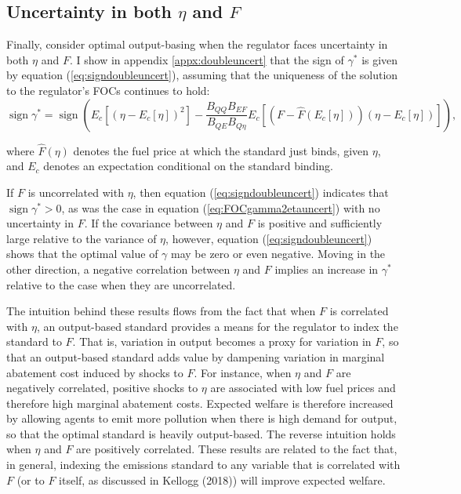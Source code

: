 \documentclass[12pt]{article}
\DeclareMathOperator{\sign}{sign}
\begin{document}
\subsection{Uncertainty in both $\eta$ and $F$} \label{sec:etaFuncert}

Finally, consider optimal output-basing when the regulator faces uncertainty in both $\eta$ and $F$. I show in appendix \ref{appx:doubleuncert} that the sign of $\gamma^*$ is given by equation (\ref{eq:signdoubleuncert}), assuming that the uniqueness of the solution to the regulator's FOCs continues to hold:
\begin{equation}
\sign{\gamma^*}=\sign{\left(E_c[(\eta-E_c[\eta])^2] - \frac{B_{QQ}B_{EF}}{B_{QE}B_{Q\eta}}E_c[(F-\hat{F}(E_c[\eta]))(\eta-E_c[\eta])]\right)}, \label{eq:signdoubleuncert}
\end{equation}

where $\hat{F}(\eta)$ denotes the fuel price at which the standard just binds, given $\eta$, and $E_c$ denotes an expectation conditional on the standard binding.

If $F$ is uncorrelated with $\eta$, then equation (\ref{eq:signdoubleuncert}) indicates that $\sign{\gamma^*}>0$, as was the case in equation (\ref{eq:FOCgamma2etauncert}) with no uncertainty in $F$. If the covariance between $\eta$ and $F$ is positive and sufficiently large relative to the variance of $\eta$, however, equation (\ref{eq:signdoubleuncert}) shows that the optimal value of $\gamma$ may be zero or even negative. Moving in the other direction, a negative correlation between $\eta$ and $F$ implies an increase in $\gamma^*$ relative to the case when they are uncorrelated. 

The intuition behind these results flows from the fact that when $F$ is correlated with $\eta$, an output-based standard provides a means for the regulator to index the standard to $F$. That is, variation in output becomes a proxy for variation in $F$, so that an output-based standard adds value by dampening variation in marginal abatement cost induced by shocks to $F$. For instance, when $\eta$ and $F$ are negatively correlated, positive shocks to $\eta$ are associated with low fuel prices and therefore high marginal abatement costs. Expected welfare is therefore increased by allowing agents to emit more pollution when there is high demand for output, so that the optimal standard is heavily output-based. The reverse intuition holds when $\eta$ and $F$ are positively correlated. These results are related to the fact that, in general, indexing the emissions standard to any variable that is correlated with $F$ (or to $F$ itself, as discussed in Kellogg (2018)) will improve expected welfare.
\end{document}
